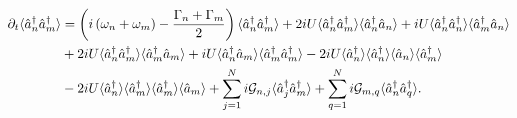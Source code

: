 \begin{adjustwidth}{0cm}{0cm}
\begin{align}
\partial_t\langle\hat{a}_n^\dagger\hat{a}_m^\dagger\rangle &= \left(i \left(\omega_n + \omega_m\right) - \frac{\Gamma_n + \Gamma_m}{2}\right) \langle \hat{a}_n^\dagger \hat{a}_m^\dagger\rangle + 2 i U \langle\hat{a}_n^\dagger \hat{a}_m^\dagger\rangle \langle \hat{a}_n^\dagger \hat{a}_n\rangle + i U \langle \hat{a}_n^\dagger \hat{a}_n^\dagger \rangle \langle \hat{a}_m^\dagger \hat{a}_n\rangle \notag \\
&+ 2 i U \langle\hat{a}_n^\dagger \hat{a}_m^\dagger \rangle \langle \hat{a}_m^\dagger \hat{a}_m\rangle + i U \langle \hat{a}_n^\dagger \hat{a}_m\rangle \langle \hat{a}_m^\dagger \hat{a}_m^\dagger \rangle - 2 i U \langle\hat{a}_n^\dagger \rangle \langle \hat{a}_n^\dagger \rangle \langle \hat{a}_n \rangle \langle \hat{a}_m^\dagger\rangle \notag \\
&- 2 i U \langle \hat{a}_n^\dagger \rangle \langle \hat{a}_m^\dagger \rangle \langle \hat{a}_m^\dagger \rangle \langle \hat{a}_m\rangle %
 + \sum_{j=1}^N i \mathcal{G}_{n, j} \langle\hat{a}_j^\dagger \hat{a}_m^\dagger\rangle + \sum_{q=1}^N i \mathcal{G}_{m, q} \langle\hat{a}_n^\dagger \hat{a}_q^\dagger\rangle.
\end{align} 
\end{adjustwidth}


%

